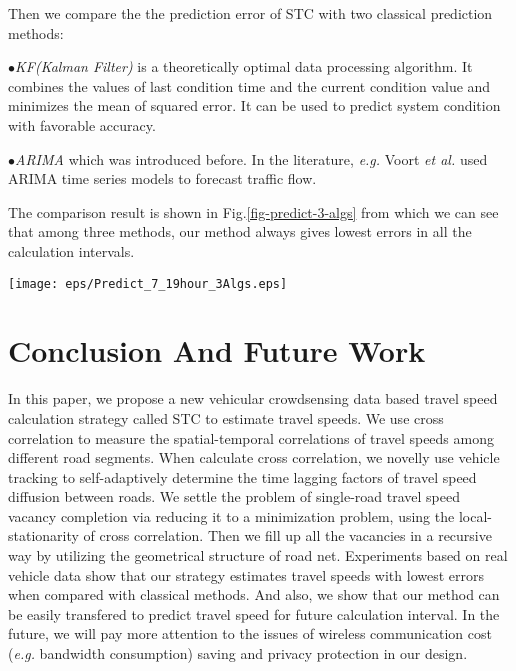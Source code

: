 \documentclass[twocolumn,10pt,final,conference]{IEEEtran}
\def\etal{\textit{et al.}\xspace}
\def\eg{\textit{e.g.}\xspace}
\begin{document}
Then we compare the the prediction error of STC with two  classical prediction methods:

$\bullet$\emph{KF(Kalman Filter)} is a theoretically optimal data processing algorithm\cite{Ref80}\cite{Ref92}\cite{Ref81}. It combines the values of last condition time and the current condition value and minimizes the mean of squared error. It can be used to predict system condition with favorable accuracy.

$\bullet$\emph{ARIMA} which was introduced before. In the literature, \eg Voort \etal \cite{Ref83} used ARIMA time series models to forecast traffic flow.

The comparison result is shown in Fig.\ref{fig-predict-3-algs} from which we can see that among three methods, our method always gives lowest errors in all the calculation intervals.
\begin{figure*}[t]
  \centering
\texttt{[image: eps/Predict\_7\_19hour\_3Algs.eps]}\\
  \caption{The prediction errors of STC, KF, and ARIMA. STC always gives the lowest errors among three methods.}
  \label{fig-predict-3-algs}
\end{figure*}



\section{Conclusion And Future Work}\label{section-Conclusion And Future Work}
In this paper, we propose a new vehicular crowdsensing data based travel speed calculation strategy called STC to estimate travel speeds. We use cross correlation to measure the spatial-temporal correlations of travel speeds among different road segments. When calculate cross correlation, we novelly use vehicle tracking to self-adaptively determine the time lagging factors of travel speed diffusion between roads. We settle the problem of single-road travel speed vacancy completion via reducing it to a minimization problem, using the local-stationarity of cross correlation. Then we fill up all the vacancies in a recursive way by utilizing the geometrical structure of road net. Experiments based on real vehicle data show that our strategy estimates travel speeds with lowest errors when compared with classical methods. And also, we show that our method can be easily transfered to predict travel speed for future calculation interval. In the future, we will pay more attention to the issues of wireless communication cost (\eg bandwidth consumption) saving and privacy protection in our design.





\end{document}
